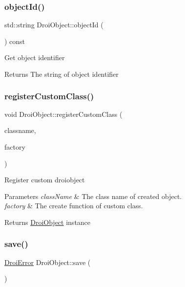 \subsubsection{\texorpdfstring{object\+Id()}{objectId()}}
{\footnotesize\ttfamily std\+::string Droi\+Object\+::object\+Id (\begin{DoxyParamCaption}{ }\end{DoxyParamCaption}) const\hspace{0.3cm}{\ttfamily [inline]}}

Get object identifier \begin{DoxyReturn}{Returns}
The string of object identifier 
\end{DoxyReturn}
\mbox{\label{class_droi_object_a35f70b4ed21029d64b12fb9fde9f10f4}} 
\subsubsection{\texorpdfstring{register\+Custom\+Class()}{registerCustomClass()}}
{\footnotesize\ttfamily void Droi\+Object\+::register\+Custom\+Class (\begin{DoxyParamCaption}\item[{std\+::string}]{classname,  }\item[{\hyperlink{class_droi_object_af2570fc1461d2917f4f69444619e6600}{create\+Object}}]{factory }\end{DoxyParamCaption})\hspace{0.3cm}{\ttfamily [static]}}

Register custom droiobject 
\begin{DoxyParams}{Parameters}
{\em class\+Name} & The class name of created object. \\
\hline
{\em factory} & The create function of custom class. \\
\hline
\end{DoxyParams}
\begin{DoxyReturn}{Returns}
\hyperlink{class_droi_object}{Droi\+Object} instance 
\end{DoxyReturn}
\mbox{\label{class_droi_object_a2e5138d61ee8860b559300cf7446f085}} 
\subsubsection{\texorpdfstring{save()}{save()}}
{\footnotesize\ttfamily \hyperlink{class_droi_error}{Droi\+Error} Droi\+Object\+::save (\begin{DoxyParamCaption}{ }\end{DoxyParamCaption})\hspace{0.3cm}{\ttfamily [virtual]}}

